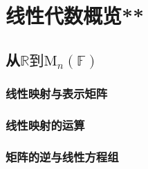 \chapter{线性代数概览**}%
\section{从\texorpdfstring{$\mathbb{R}\text{到}\mathrm{M}_n(\mathbb{F})$}s}
\clearpage
\subsection{线性映射与表示矩阵}
\clearpage
\subsection{线性映射的运算}
\clearpage
\subsection{矩阵的逆与线性方程组}
\clearpage
